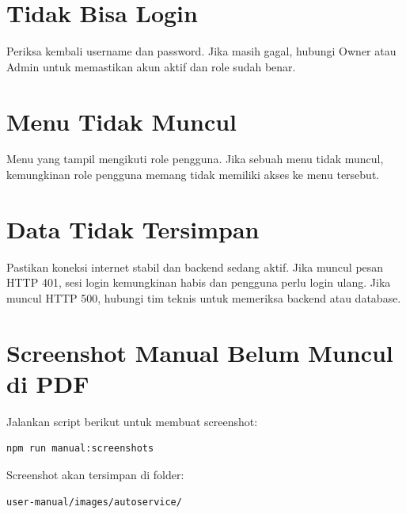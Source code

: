 \documentclass[12pt,a4paper]{report}
\begin{document}
\section{Tidak Bisa Login}
Periksa kembali username dan password. Jika masih gagal, hubungi Owner atau Admin untuk memastikan akun aktif dan role sudah benar.

\section{Menu Tidak Muncul}
Menu yang tampil mengikuti role pengguna. Jika sebuah menu tidak muncul, kemungkinan role pengguna memang tidak memiliki akses ke menu tersebut.

\section{Data Tidak Tersimpan}
Pastikan koneksi internet stabil dan backend sedang aktif. Jika muncul pesan HTTP 401, sesi login kemungkinan habis dan pengguna perlu login ulang. Jika muncul HTTP 500, hubungi tim teknis untuk memeriksa backend atau database.

\section{Screenshot Manual Belum Muncul di PDF}
Jalankan script berikut untuk membuat screenshot:

\begin{verbatim}
npm run manual:screenshots
\end{verbatim}

Screenshot akan tersimpan di folder:

\begin{verbatim}
user-manual/images/autoservice/
\end{verbatim}
\end{document}

